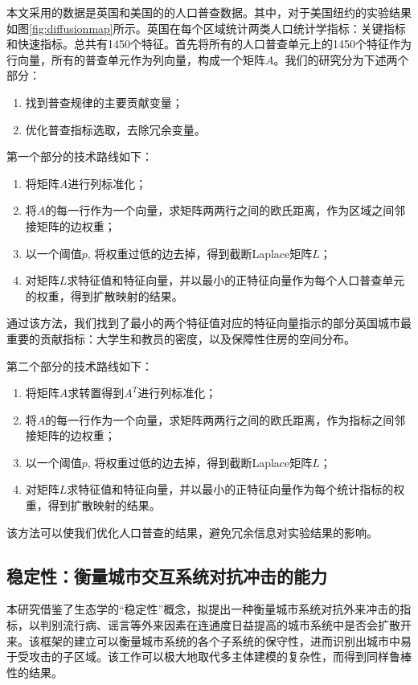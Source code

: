 本文采用的数据是英国和美国的的人口普查数据。其中，对于美国纽约的实验结果如图\ref{fig:diffusionmap}所示。英国在每个区域统计两类人口统计学指标：关键指标和快速指标。总共有1450个特征\cite{barter2019manifold}。首先将所有的人口普查单元上的1450个特征作为行向量，所有的普查单元作为列向量，构成一个矩阵$A$。我们的研究分为下述两个部分：\begin{enumerate}
    \item 找到普查规律的主要贡献变量；
    \item 优化普查指标选取，去除冗余变量。
\end{enumerate}
第一个部分的技术路线如下：\begin{enumerate}
    \item 将矩阵$A$进行列标准化；
    \item 将$A$的每一行作为一个向量，求矩阵两两行之间的欧氏距离，作为区域之间邻接矩阵的边权重；
    \item 以一个阈值$p$, 将权重过低的边去掉，得到截断Laplace矩阵$L$；
    \item 对矩阵$L$求特征值和特征向量，并以最小的正特征向量作为每个人口普查单元的权重，得到扩散映射的结果。
\end{enumerate} 通过该方法，我们找到了最小的两个特征值对应的特征向量指示的部分英国城市最重要的贡献指标：大学生和教员的密度，以及保障性住房的空间分布。

第二个部分的技术路线如下：\begin{enumerate}
    \item 将矩阵$A$求转置得到$A^T$进行列标准化；
    \item 将$A$的每一行作为一个向量，求矩阵两两行之间的欧氏距离，作为指标之间邻接矩阵的边权重；
    \item 以一个阈值$p$, 将权重过低的边去掉，得到截断Laplace矩阵$L$；
    \item 对矩阵$L$求特征值和特征向量，并以最小的正特征向量作为每个统计指标的权重，得到扩散映射的结果。
\end{enumerate} 该方法可以使我们优化人口普查的结果，避免冗余信息对实验结果的影响。


\subsection{稳定性：衡量城市交互系统对抗冲击的能力}

本研究借鉴了生态学的“稳定性”概念\cite{may1972will}，拟提出一种衡量城市系统对抗外来冲击的指标，以判别流行病、谣言等外来因素在连通度日益提高的城市系统中是否会扩散开来。该框架的建立可以衡量城市系统的各个子系统的保守性，进而识别出城市中易于受攻击的子区域。该工作可以极大地取代多主体建模的复杂性，而得到同样鲁棒性的结果。

